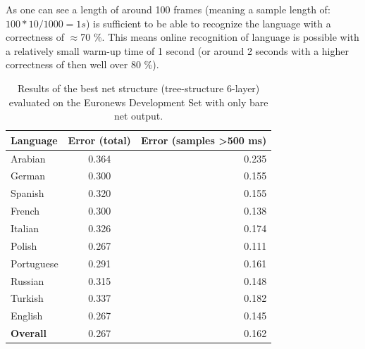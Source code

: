 As one can see a length of around 100 frames (meaning a sample length of: \(100*10 / 1000 = 1s \)) is sufficient to be able to recognize the language with a correctness of \(\approx\)70 \%. This means online recognition of language is possible with a relatively small warm-up time of 1 second (or around 2 seconds with a higher correctness of then well over 80 \%).
\begin{figure}[h!]
\label{fig:lengthBasic}
\end{figure}
\begin{table}[h!]
\caption{Results of the best net structure (tree-structure 6-layer) evaluated on the Euronews Development Set with only bare net output.}
\label{tab:bareResults}
\centering
\begin{tabular}{| l | c | r | }
	\hline
	\textbf{Language} & \textbf{Error (total)}  & \textbf{Error (samples >500 ms)} \\
	\hline
	Arabian & 0.364 &  0.235 \\
	German & 0.300 &  0.155 \\
	Spanish & 0.320 & 0.155 \\ 
	French & 0.300  & 0.138 \\
	Italian & 0.326  & 0.174 \\
	Polish & 0.267 & 0.111 \\
	Portuguese& 0.291 & 0.161 \\
	Russian&  0.315 & 0.148 \\
	Turkish&  0.337 & 0.182 \\
	English&  0.267 &0.145\\
	\hline
	\textbf{Overall} & 0.267 & 0.162\\
	\hline
\end{tabular}
\end{table}

